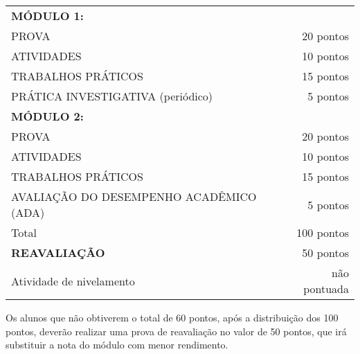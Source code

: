 \small

\begin{tabular}{lr}
\bf MÓDULO 1: & \\
PROVA & 20 pontos \\
ATIVIDADES & 10 pontos \\
TRABALHOS PRÁTICOS & 15 pontos \\
PRÁTICA INVESTIGATIVA (periódico) & 5 pontos \\
\hline
\bf MÓDULO 2: & \\
PROVA & 20 pontos \\
ATIVIDADES & 10 pontos \\
TRABALHOS PRÁTICOS & 15 pontos \\
AVALIAÇÃO DO DESEMPENHO ACADÊMICO (ADA) & 5 pontos \\
\hline
Total & 100 pontos \\
\hline
\bf REAVALIAÇÃO & 50 pontos \\
\hline
Atividade de nivelamento & não pontuada \\
\hline
\end{tabular}

$\;$ \\

Os alunos que não obtiverem o total de 60 pontos, após a distribuição dos 100
pontos, deverão realizar uma prova de reavaliação no valor de 50 pontos, que
irá substituir a nota do módulo com menor rendimento.